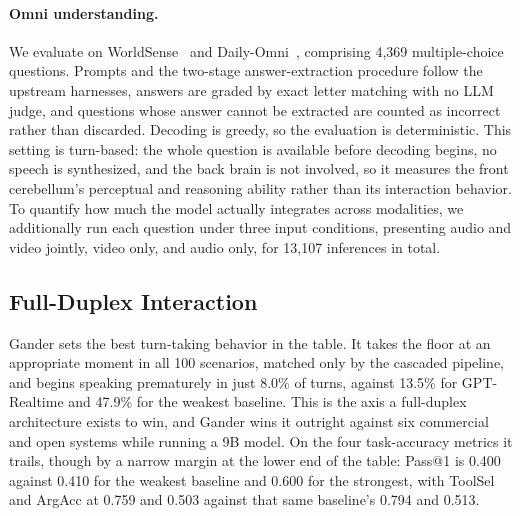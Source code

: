 \paragraph{Omni understanding.}
We evaluate on WorldSense~\cite{worldsense2025} and Daily-Omni~\cite{dailyomni2025}, comprising
4{,}369 multiple-choice questions. Prompts and the two-stage answer-extraction procedure
follow the upstream harnesses, answers are graded by exact letter matching with no LLM judge,
and questions whose answer cannot be extracted are counted as incorrect rather than discarded.
Decoding is greedy, so the evaluation is deterministic. This setting is turn-based: the whole
question is available before decoding begins, no speech is synthesized, and the back
brain is not involved, so it measures the front cerebellum's perceptual and reasoning ability
rather than its interaction behavior. To quantify how much the model actually integrates
across modalities, we additionally run each question under three input conditions, presenting
audio and video jointly, video only, and audio only, for 13{,}107 inferences in total.

\subsection{Full-Duplex Interaction}
\label{sec:result_duplex}



Gander sets the best turn-taking behavior in the table. It takes the floor at an appropriate
moment in all 100 scenarios, matched only by the cascaded pipeline, and begins speaking
prematurely in just 8.0\% of turns, against 13.5\% for GPT-Realtime and 47.9\% for the weakest
baseline. This is the axis a full-duplex architecture exists to win, and Gander wins it outright
against six commercial and open systems while running a 9B model. On the four task-accuracy
metrics it trails, though by a narrow margin at the lower end of the table: Pass@1 is 0.400
against 0.410 for the weakest baseline and 0.600 for the strongest, with ToolSel and ArgAcc at
0.759 and 0.503 against that same baseline's 0.794 and 0.513.

